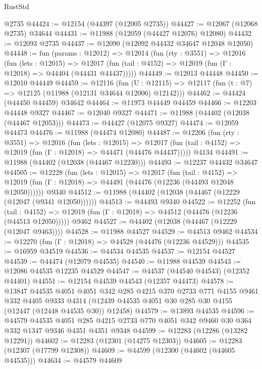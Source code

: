 \begin{lexlean}{RustStd}
\begin{coremodule}
    @2735
@44424 := @12154 (@44397 (@12005 @2735))
@44427 := @12067 (@12068 @2735) @34644
@44431 := @11988 (@12059 (@44427 @12076) @12080)
@44432 := @12093 @2735
@44437 := @12090 (@12092 @44432 @34647 @12048 @12050)
@44448 := fun (params : @12012) =>
  @12014
    (fun (rty : @3551) =>
    @12016
      (fun (lets : @12015) =>
      @12017 (fun (tail : @4152) => @12019 (fun (Γ : @12018) => @44404 (@44431 @44437)))))
@44449 := @12013 @44448
@44450 := @12010 @44449
@44459 := @12116
    (fun (U : @12115) => @12117 (fun (t : @7) => @12125 (@11988 (@12131 @34644 @12006) @12142)))
@44462 := @44424 (@44450 @44459) @34642
@44464 := @11973 @44449 @44459
@44466 := @12203 @44448 @9327
@44467 := @12040 @9327
@44471 := @11988 (@44402 (@12038 (@44467 @12053)))
@44473 := @44427 (@12075 @9327)
@44474 := @12059 @44473
@44476 := @11988 (@44474 @12080)
@44487 := @12206
    (fun (rty : @3551) =>
    @12016
      (fun (lets : @12015) =>
      @12017 (fun (tail : @4152) => @12019 (fun (Γ : @12018) => @44471 (@44476 @44437)))))
    @4134
@44491 := @11988 (@44402 (@12038 (@44467 @12230)))
@44493 := @12237 @44432 @34647
@44505 := @12228
    (fun (lets : @12015) =>
    @12017
      (fun (tail : @4152) =>
      @12019 (fun (Γ : @12018) => @44491 (@44476 (@12236 (@44493 @12048 @12050))))))
    @9340
@44512 := @11988 (@44402 (@12038 (@44467 (@12229 (@12047 (@9341 @12050))))))
@44513 := @44493 @9340
@44522 := @12252
    (fun (tail : @4152) => @12019 (fun (Γ : @12018) => @44512 (@44476 (@12236 (@44513 @12050)))))
    @9462
@44527 := @44402 (@12038 (@44467 (@12229 (@12047 @9463))))
@44528 := @11988 @44527
@44529 := @44513 @9462
@44534 := @12270 (fun (Γ : @12018) => @44528 (@44476 (@12236 @44529)))
@44535 := @16959 @34519
@44536 := @44534 @44535
@44537 := @12154 @44527
@44539 := @44474 (@12079 @44535)
@44540 := @11988 @44539
@44543 := @12086 @44535 @12235 @44529
@44547 := @44537 (@44540 @44543) (@12352 @44401)
@44551 := @12154 @44539 @44543 (@12357 @44473)
@44578 := @13847
    @44535
    @4051
    @4051
    @342
    @285
    @4215
    @370
    @2733
    @771
    @4155
    @9461
    @332
    @4405
    @9333
    @4314
    (@12439 @44535 @4051 @30 @285 @30 @4155 (@12447 (@12448 @44535 @30)) @12458)
@44579 := @13893 @44535
@44596 := @44579
    @44535
    @4051
    @285
    @4215
    @2733
    @770
    @4051
    @342
    @9460
    @30
    @364
    @332
    @1347
    @9346
    @4351
    @4351
    @9348
@44599 := @12283 (@12286 (@13282 @12291))
@44602 := @12283 (@12301 (@14275 @12303))
@44605 := @12283 (@12307 (@17799 @12308))
@44609 := @44599 (@12300 (@44602 (@44605 @44535)))
@44634 := @44579
    @44609

\end{coremodule}
\end{lexlean}
